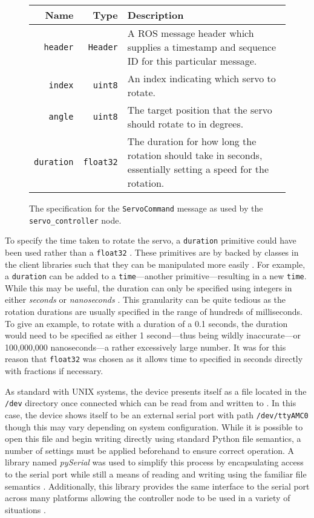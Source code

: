 \begin{figure}[!h]
	\centering
	\begin{tabular}{ r r p{10cm} }
		\textbf{Name} & \textbf{Type} & \textbf{Description} \\
		\hline

		\texttt{header} & 
		\texttt{Header}	& 
		A ROS message header which supplies a timestamp and sequence ID for this particular message. \\

		\texttt{index} & 
		\texttt{uint8} &
		 An index indicating which servo to rotate. \\
		
		\texttt{angle} & 
		\texttt{uint8} & 
		The target position that the servo should rotate to in degrees. \\
		
		\texttt{duration} &
		\texttt{float32} &
		The duration for how long the rotation should take in seconds, essentially setting a speed for the rotation. \\
	\end{tabular}
	\caption{The specification for the \texttt{ServoCommand} message as used by the \texttt{servo\_controller} node.}
	\label{fig:servocommand_msg}
\end{figure}

To specify the time taken to rotate the servo, a \texttt{duration} primitive could have been used rather than a \texttt{float32} \cite{ros_wiki_msg}. These primitives are by backed by classes in the client libraries such that they can be manipulated more easily \cite{ros_api_duration_msg}. For example, a \texttt{duration} can be added to a \texttt{time}---another primitive---resulting in a new \texttt{time}. While this may be useful, the duration can only be specified using integers in either \emph{seconds} or \emph{nanoseconds} \cite{ros_api_duration_msg}. This granularity can be quite tedious as the rotation durations are usually specified in the range of hundreds of milliseconds. To give an example, to rotate with a duration of a 0.1 seconds, the duration would need to be specified as either 1 second---thus being wildly inaccurate---or 100,000,000 nanoseconds---a rather excessively large number. It was for this reason that \texttt{float32} was chosen as it allows time to specified in seconds directly with fractions if necessary.

As standard with UNIX systems, the device presents itself as a file located in the \texttt{/dev} directory once connected which can be read from and written to \cite{unix_devices}. In this case, the device shows itself to be an external serial port with path \texttt{/dev/ttyAMC0} though this may vary depending on system configuration. While it is possible to open this file and begin writing directly using standard Python file semantics, a number of settings must be applied beforehand to ensure correct operation. A library named \emph{pySerial} was used to simplify this process by encapsulating access to the serial port while still a means of reading and writing using the familiar file semantics \cite{pyserial}. Additionally, this library provides the same interface to the serial port across many platforms allowing the controller node to be used in a variety of situations \cite{pyserial}.

